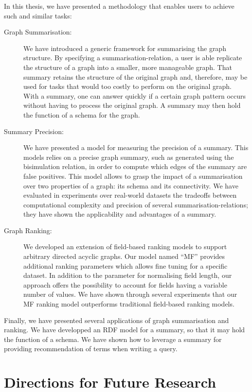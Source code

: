 In this thesis, we have presented a methodology that enables users to achieve such and similar tasks:
\begin{description}
	\item[Graph Summarisation:] We have introduced a generic framework for summarising the graph structure. By specifying a \gls{summarisation-relation}, a user is able replicate the structure of a graph into a smaller, more manageable graph. That summary retains the structure of the original graph and, therefore, may be used for tasks that would too costly to perform on the original graph. With a summary, one can answer quickly if a certain graph pattern occurs without having to process the original graph. A summary may then hold the function of a schema for the graph.
	\item[Summary Precision:] We have presented a model for measuring the precision of a summary. This models relies on a precise graph summary, such as generated using the bisimulation relation, in order to compute which edges of the summary are false positives. This model allows to grasp the impact of a summarisation over two properties of a graph: its \gls{schema} and its \gls{connectivity}. We have evaluated in experiments over real-world datasets the tradeoffs between computational complexity and precision of several \glspl{summarisation-relation}; they have shown the applicability and advantages of a summary.
	\item[Graph Ranking:] We developed an extension of \gls{field}-based ranking models to support arbitrary directed acyclic graphs. Our model named ``MF'' provides additional ranking parameters which allows fine tuning for a specific dataset. In addition to the parameter for normalising field length, our approach offers the possibility to account for fields having a variable number of values. We have shown through several experiments that our \gls{MF} ranking model outperforms traditional field-based ranking models.
\end{description}
Finally, we have presented several applications of graph summarisation and ranking. We have developped an RDF model for a summary, so that it may hold the function of a schema. We have shown how to leverage a summary for providing recommendation of terms when writing a query.

\section{Directions for Future Research}

